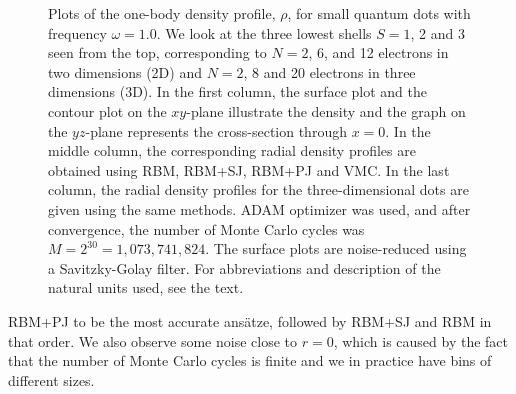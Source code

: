 \begin{figure}[H]
	\hspace{0.1cm}
	\hspace{-0.0cm}
	\hspace{-0.5cm}
	
	\caption{Plots of the one-body density profile, $\rho$, for small quantum dots with frequency $\omega=1.0$. We look at the three lowest shells $S=1$, 2 and 3 seen from the top, corresponding to $N=2$, 6, and 12 electrons in two dimensions (2D) and $N=2$, 8 and 20 electrons in three dimensions (3D). In the first column, the surface plot and the contour plot on the $xy$-plane illustrate the density and the graph on the $yz$-plane represents the cross-section through $x=0$. In the middle column, the corresponding radial density profiles are obtained using RBM, RBM+SJ, RBM+PJ and VMC. In the last column, the radial density profiles for the three-dimensional dots are given using the same methods. ADAM optimizer was used, and after convergence, the number of Monte Carlo cycles was $M=2^{30}=1,073,741,824$. The surface plots are noise-reduced using a Savitzky-Golay filter. For  abbreviations and description of the natural units used, see the text.}
	\label{fig:OB_interaction_23D}
\end{figure}
\noindent
RBM+PJ to be the most accurate ansätze, followed by RBM+SJ and RBM in that order. We also observe some noise close to $r=0$, which is caused by the fact that the number of Monte Carlo cycles is finite and we in practice have bins of different sizes.

